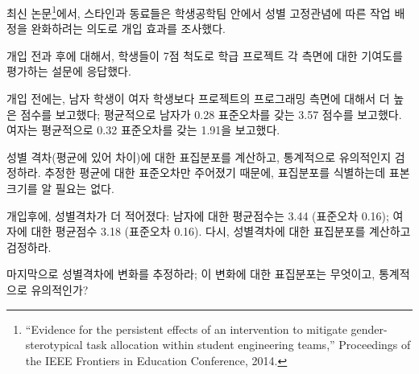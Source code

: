 \begin{exercise}
최신 논문\footnote{``Evidence for the persistent effects of an
  intervention to mitigate gender-sterotypical task allocation within
  student engineering teams,'' Proceedings of the IEEE Frontiers in Education
Conference, 2014.}에서, 스타인과 동료들은 
학생공학팀 안에서 성별 고정관념에 따른 작업 배정을 완화하려는 의도로 개입 효과를 조사했다.

개입 전과 후에 대해서, 학생들이 7점 척도로 학급 프로젝트 각 측면에 대한 기여도를 
평가하는 설문에 응답했다.

개입 전에는, 남자 학생이 여자 학생보다 프로젝트의 프로그래밍 측면에 대해서
더 높은 점수를 보고했다; 평균적으로 남자가 0.28 표준오차를 갖는 3.57
점수를 보고했다. 여자는 평균적으로 0.32 표준오차를 갖는 1.91을 보고했다.

성별 격차(평균에 있어 차이)에 대한 표집분포를 계산하고,
통계적으로 유의적인지 검정하라.
추정한 평균에 대한 표준오차만 주어졌기 때문에,
표집분포를 식별하는데 표본크기를 알 필요는 없다.
   

개입후에, 성별격차가 더 적어졌다:
남자에 대한 평균점수는 3.44 (표준오차 0.16); 여자에 대한 평균점수 3.18 (표준오차 0.16).
다시, 성별격차에 대한 표집분포를 계산하고 검정하라.

마지막으로 성별격차에 변화를 추정하라; 이 변화에 대한 표집분포는 무엇이고,
통계적으로 유의적인가?
   
\end{exercise}

